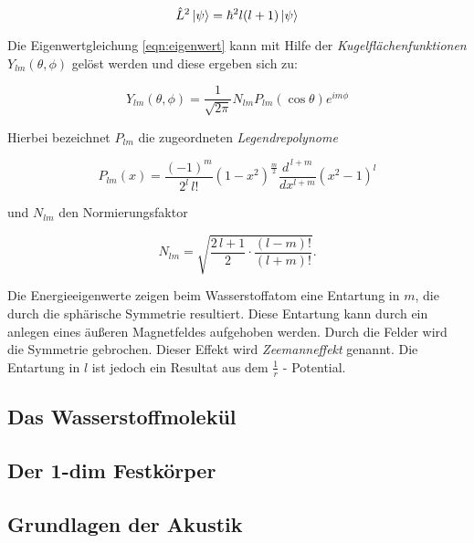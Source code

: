 \begin{equation}
    \hat{L}^2 \ket{\psi} = \hbar^2 l(l+1) \ket{\psi}
    \label{eqn:L}
\end{equation}

Die Eigenwertgleichung \eqref{eqn:eigenwert} kann mit Hilfe der \textit{Kugelflächenfunktionen} $Y_{lm} (\theta, \phi)$ gelöst werden und diese ergeben sich zu:

\begin{equation}
    Y_{lm} (\theta, \phi) = \frac{1}{\sqrt{2 \pi}} N_{lm} P_{lm} (\cos \theta) e^{im\phi}
    \label{eqn:kugelflaechen}
\end{equation}

Hierbei bezeichnet $P_{lm}$ die zugeordneten \textit{Legendrepolynome}

\begin{equation}
    P_{lm} (x) = \frac{(-1)^m}{2^l \, l!} \left( 1-x^2 \right)^{\! \frac{m}{2}} \frac{d^{\, l+m}}{dx^{l+m}} \left( x^2 - 1 \right)^l
    \label{eqn:legendre}
\end{equation}

und $N_{lm}$ den Normierungsfaktor

\begin{equation}
    N_{lm} = \sqrt{\frac{2 \, l +1}{2} \cdot \frac{(l-m)!}{(l+m)!}} .
    \label{eqn:normierung}
\end{equation}

Die Energieeigenwerte zeigen beim Wasserstoffatom eine Entartung in $m$, die durch die sphärische Symmetrie resultiert. Diese Entartung kann durch ein anlegen eines äußeren Magnetfeldes aufgehoben werden. Durch die Felder wird die Symmetrie gebrochen. Dieser Effekt wird \textit{Zeemanneffekt} genannt. Die Entartung in $l$ ist jedoch ein Resultat aus dem $\frac{1}{r}$ - Potential.

\subsection{Das Wasserstoffmolekül}
\label{sec:H2}



\subsection{Der 1-dim Festkörper}
\label{sec:festkoerper}



\subsection{Grundlagen der Akustik}
\label{sec:akustik}



